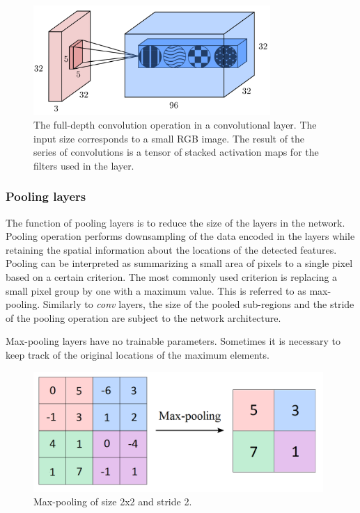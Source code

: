 \vspace{4mm}
\begin{figure}[htb]
	\begin{center}
		\includegraphics*[width=9cm, keepaspectratio]{obr/conv.png}
	\end{center}
	\vspace{4mm}
	\caption{The full-depth convolution operation in a convolutional layer. The input size corresponds to a small RGB image. The result of the series of convolutions is a tensor of stacked activation maps for the filters used in the layer. \cite{coors}} 
	\label{conv}
\end{figure}

\subsubsection{Pooling layers}

The function of pooling layers is to reduce the size of the layers in the network. Pooling operation performs downsampling of the data encoded in the layers while retaining the spatial information about the locations of the detected features. Pooling can be interpreted as summarizing a small area of pixels to a single pixel based on a certain criterion. The most commonly used criterion is replacing a small pixel group by one with a maximum value. This is referred to as max-pooling. Similarly to \textit{conv} layers, the size of the pooled sub-regions and the stride of the pooling operation are subject to the network architecture. \cite{mehlig}

Max-pooling layers have no trainable parameters. Sometimes it is necessary to keep track of the original locations of the maximum elements. \cite{segnet}

\vspace{4mm}
\begin{figure}[htb]
	\begin{center}
		\includegraphics*[width=11cm, keepaspectratio]{obr/pool.png}
	\end{center}
	\vspace{4mm}
	\caption{Max-pooling of size 2x2 and stride 2. \cite{coors}} 
	\label{pool}
\end{figure}

